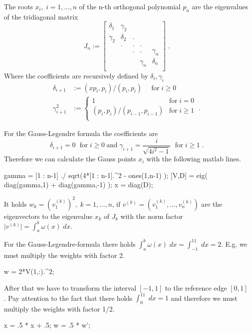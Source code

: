 \begin{theorem}
The roots $x_i,\; i=1,\ldots,n$ of the n-th orthogonal polynomial $p_n$ are the
eigenvalues of the tridiagonal matrix
\begin{equation*}
J_n := \left[
\begin{array}{ccccc}
    \delta_1  & \gamma_2 &   &   & \\
    \gamma_2  & \delta_2 & . &   & \\
              & .        & . & . & \\
              &          & . & . &\gamma_n \\
              &          &   & \gamma_n & \delta_n \\
\end{array}
\right]\; .
\end{equation*}
Where the coefficients are recursively defined by $\delta_i,\gamma_i$
\begin{equation*}
\begin{split}
  \delta_{i+1} &:= (x p_i, p_i) / (p_i, p_i) \quad\textrm{ for}\; i\geq 0\\
  \gamma_{i+1}^2 &:= \left\{
\begin{array}{ll}
    1 & \textrm{for} \; i=0 \\
    (p_i,p_i)/(p_{i-1},p_{i-1}) & \textrm{for}\; i\geq 1\\
\end{array}\right.\; .
\end{split}
\end{equation*}
\end{theorem}
\noindent
For the Gauss-Legendre formula the coefficients are
\begin{equation*}
\delta_{i+1} = 0\; \textrm{ for}\; i\geq 0 \; \textrm{and} \; \gamma_{i+1} = \frac{i}{\sqrt{4i^2-1}}\;\textrm{ for}\; i\geq 1\; .
\end{equation*}
Therefore we can calculate the Gauss points $x_i$ with the following matlab lines.
\begin{pcode}
gamma = [1 : n-1] ./ sqrt(4*[1 : n-1].^2 - ones(1,n-1) );
[V,D] = eig( diag(gamma,1) + diag(gamma,-1) );
x = diag(D);
\end{pcode}
%
\begin{theorem}
It holds $ w_k = (v_1^{(k)})^2,\; k = 1,\ldots,n$, if $v^{(k)}=(v_1^{(k)},\ldots,v_n^{(k)})$ are the eigenvectors to the eigenvalue $x_k$ of $J_k$ with the norm factor $\lvert v^{(k)}\rvert = \int_{a}^b\omega(x)\; dx$.
\end{theorem}
For the Gauss-Legendre-formula there holds $\int_{a}^b\omega(x)\; dx = \int_{-1}^11\; dx=2$. E.g. we must multiply the weights with factor 2.
\begin{pcode}
w = 2*V(1,:).^2;
\end{pcode}
After that we have to transform the interval $[-1,1]$ to the reference edge $[0,1]$. Pay attention to the fact that there holds $\int_{0}^11\; dx=1$ and therefore we must multiply the weights with factor 1/2.
\begin{pcode}
x = .5 * x + .5;
w = .5 * w';
\end{pcode}

